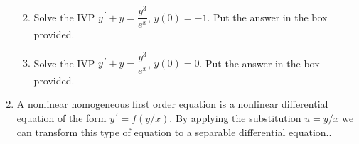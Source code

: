 \documentclass{ximera}
\begin{document}
\begin{enumerate}
\begin{enumerate}
    
    
    
    
    




\hfill{}

\vfill

\newpage

\item  Solve the IVP $y^{\,\prime}+y=\dfrac{y^3}{e^{x}}$, $y(0)=-1$.  Put the answer in the box provided.




\hfill{}\fbox{ \begin{minipage}{3in}\vspace{0.25in} \hfill\vspace{0.25in} \end{minipage} }


\vfill


\item  Solve the IVP $y^{\,\prime}+y=\dfrac{y^3}{e^{x}}$, $y(0)=0$.  Put the answer in the box provided.




\hfill{}\fbox{ \begin{minipage}{3in}\vspace{0.25in} \hfill\vspace{0.25in} \end{minipage} }


\vfill

\end{enumerate}

\newpage



\item  A \underline{nonlinear homogeneous} first order equation is a nonlinear differential equation of the form $y^{\,\prime}=f(y/x)$. By applying the substitution $u=y/x$ we can transform this type of equation to a separable differential equation..




\end{enumerate}
\end{document}
